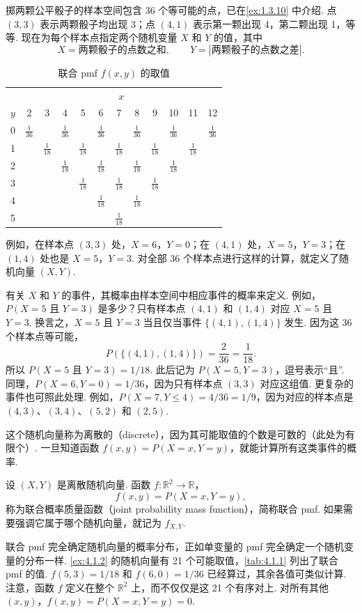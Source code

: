\begin{example}[骰子的样本空间]\label{ex:4.1.2}
掷两颗公平骰子的样本空间包含 36 个等可能的点，已在\autoref{ex:1.3.10} 中介绍. 点 $(3,3)$ 表示两颗骰子均出现 3；点 $(4,1)$ 表示第一颗出现 4，第二颗出现 1，等等. 现在为每个样本点指定两个随机变量 $X$ 和 $Y$ 的值，其中
$$
X=\text{两颗骰子的点数之和},\qquad Y=|\text{两颗骰子的点数之差}|.
$$

\begin{table}[htbp]
\centering\small
\caption{联合 pmf $f(x,y)$ 的取值}\label{tab:4.1.1}
\setlength{\tabcolsep}{5pt}
\begin{tabular}{c|ccccccccccc}
 &\multicolumn{11}{c}{$x$}\\
$y$&2&3&4&5&6&7&8&9&10&11&12\\\hline
0&$\frac1{36}$&&$\frac1{36}$&&$\frac1{36}$&&$\frac1{36}$&&$\frac1{36}$&&$\frac1{36}$\\[3pt]
1&&$\frac1{18}$&&$\frac1{18}$&&$\frac1{18}$&&$\frac1{18}$&&$\frac1{18}$&\\[3pt]
2&&&$\frac1{18}$&&$\frac1{18}$&&$\frac1{18}$&&$\frac1{18}$&&\\[3pt]
3&&&&$\frac1{18}$&&$\frac1{18}$&&$\frac1{18}$&&&\\[3pt]
4&&&&&$\frac1{18}$&&$\frac1{18}$&&&&\\[3pt]
5&&&&&&$\frac1{18}$&&&&&
\end{tabular}
\end{table}

例如，在样本点 $(3,3)$ 处，$X=6$，$Y=0$；在 $(4,1)$ 处，$X=5$，$Y=3$；在 $(1,4)$ 处也是 $X=5$，$Y=3$. 对全部 36 个样本点进行这样的计算，就定义了随机向量 $(X,Y)$.

有关 $X$ 和 $Y$ 的事件，其概率由样本空间中相应事件的概率来定义. 例如，$P(X=5\text{ 且 }Y=3)$ 是多少？只有样本点 $(4,1)$ 和 $(1,4)$ 对应 $X=5$ 且 $Y=3$. 换言之，$X=5$ 且 $Y=3$ 当且仅当事件 $\{(4,1),(1,4)\}$ 发生. 因为这 36 个样本点等可能，
$$
P(\{(4,1),(1,4)\})=\frac2{36}=\frac1{18}.
$$
所以 $P(X=5\text{ 且 }Y=3)=1/18$. 此后记为 $P(X=5,Y=3)$，逗号表示“且”. 同理，$P(X=6,Y=0)=1/36$，因为只有样本点 $(3,3)$ 对应这组值. 更复杂的事件也可照此处理. 例如，$P(X=7,Y\le4)=4/36=1/9$，因为对应的样本点是 $(4,3)$、$(3,4)$、$(5,2)$ 和 $(2,5)$.
\end{example}

这个随机向量称为离散的（discrete），因为其可能取值的个数是可数的（此处为有限个）. 一旦知道函数 $f(x,y)=P(X=x,Y=y)$，就能计算所有这类事件的概率.
\begin{definition}\label{def:4.1.3}
设 $(X,Y)$ 是离散随机向量. 函数 $f:\mathbb R^2\to\mathbb R$，
$$f(x,y)=P(X=x,Y=y),$$
称为联合概率质量函数（joint probability mass function），简称联合 pmf. 如果需要强调它属于哪个随机向量，就记为 $f_{X,Y}$.
\end{definition}
联合 pmf 完全确定随机向量的概率分布，正如单变量的 pmf 完全确定一个随机变量的分布一样. \autoref{ex:4.1.2} 的随机向量有 21 个可能取值，\autoref{tab:4.1.1} 列出了联合 pmf 的值. $f(5,3)=1/18$ 和 $f(6,0)=1/36$ 已经算过，其余各值可类似计算. 注意，函数 $f$ 定义在整个 $\mathbb R^2$ 上，而不仅仅是这 21 个有序对上. 对所有其他 $(x,y)$，$f(x,y)=P(X=x,Y=y)=0$.


